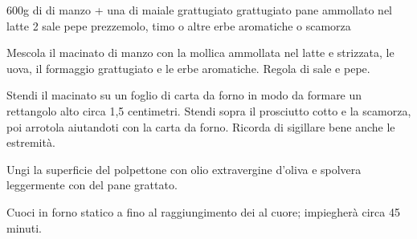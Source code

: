 \begin{ingreds}
	600g di  di manzo + una  di maiale
	 grattugiato
	 grattugiato
	pane ammollato nel latte
	2 
	sale
	pepe
	prezzemolo, timo o altre erbe aromatiche
	 o scamorza
\end{ingreds}

\begin{method}
Mescola il macinato di manzo con la mollica ammollata nel latte e strizzata, le uova, il formaggio grattugiato e le erbe aromatiche. Regola di sale e pepe.

Stendi il macinato su un foglio di carta da forno in modo da formare un rettangolo alto circa 1,5 centimetri. Stendi sopra il prosciutto cotto e la scamorza, poi arrotola aiutandoti con la carta da forno. Ricorda di sigillare bene anche le estremità.

Ungi la superficie del polpettone con olio extravergine d'oliva e spolvera leggermente con del pane grattato.

Cuoci in forno statico a  fino al raggiungimento dei  al cuore; impiegherà circa 45 minuti.
\end {method}


